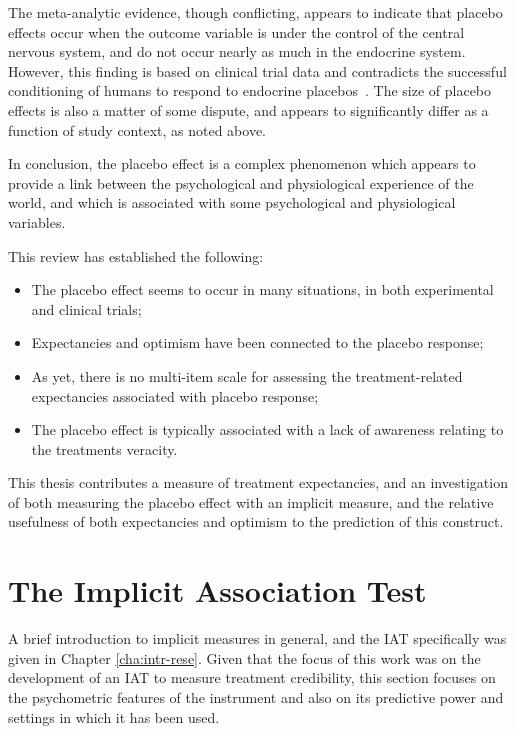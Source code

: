 The meta-analytic evidence, though conflicting, appears to indicate that placebo effects occur when the outcome variable is under the control of the central nervous system, and do not occur nearly as much in the endocrine system. However, this finding is based on clinical trial data and contradicts the successful conditioning of humans to respond to endocrine placebos~\cite{benedetti2003a}. The size of placebo effects is also a matter of some dispute, and appears to significantly differ as a function of study context, as noted above. 

In conclusion, the placebo effect is a complex phenomenon which appears to provide a link between the psychological and physiological  experience of the world, and which is associated  with some psychological and physiological variables. 

This review has established the following:

\begin{itemize}
\item The placebo effect seems to occur in many situations, in both experimental and clinical trials;
\item Expectancies and optimism have been connected to the placebo response;
\item As yet, there is no multi-item scale for assessing the treatment-related expectancies associated with placebo response;
\item The placebo effect is typically associated with a lack of awareness relating to the treatments veracity.
\end{itemize}

This thesis contributes a measure of treatment expectancies, and an investigation of both measuring the placebo effect with an implicit measure, and the relative usefulness of both expectancies and optimism to the prediction of this construct. 

\section{The Implicit Association Test}
\label{sec:impl-assoc-test}

A brief introduction to implicit measures in general, and the IAT specifically was given in Chapter \ref{cha:intr-rese}. Given that the focus of this work was on the development of an IAT to measure treatment credibility, this section focuses on the psychometric features of the instrument and also on its predictive power and settings in which it has been used. 


